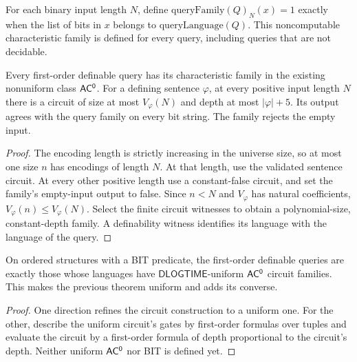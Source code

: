 \begin{definition}
  \label{def:desc-query-family}
  \leanok
  For each binary input length $N$, define
  $\mathrm{queryFamily}(Q)_N(x)=1$ exactly when the list of bits in $x$ belongs to
  $\mathrm{queryLanguage}(Q)$. This noncomputable characteristic family is
  defined for every query, including queries that are not decidable.
\end{definition}

\begin{theorem}
  \label{thm:desc-fo-ac0}
  \leanok
  Every first-order definable query has its characteristic family in the existing
  nonuniform class $\mathsf{AC^0}$. For a defining sentence $\varphi$, at every positive
  input length $N$ there is a circuit of size at most $V_\varphi(N)$ and depth at
  most $|\varphi|+5$. Its output agrees with the query family on every bit string.
  The family rejects the empty input.
\end{theorem}
\begin{proof}
  \leanok
  The encoding length is strictly increasing in the universe size, so at most one
  size $n$ has encodings of length $N$. At that length, use the validated sentence
  circuit. At every other positive length use a constant-false circuit, and set
  the family's empty-input output to false. Since $n<N$ and $V_\varphi$ has
  natural coefficients, $V_\varphi(n)\le V_\varphi(N)$. Select the finite circuit
  witnesses to obtain a polynomial-size, constant-depth family. A definability
  witness identifies its language with the language of the query.
\end{proof}

\begin{theorem}
  \label{thm:desc-ac0-fo}
  \notready
  On ordered structures with a BIT predicate, the first-order definable queries
  are exactly those whose languages have $\mathsf{DLOGTIME}$-uniform $\mathsf{AC^0}$
  circuit families. This makes the previous theorem uniform and adds its
  converse.
\end{theorem}
\begin{proof}
  One direction refines the circuit construction to a uniform one. For the other,
  describe the uniform circuit's gates by first-order formulas over tuples and
  evaluate the circuit by a first-order formula of depth proportional to the
  circuit's depth. Neither uniform $\mathsf{AC^0}$ nor BIT is defined yet.
\end{proof}

